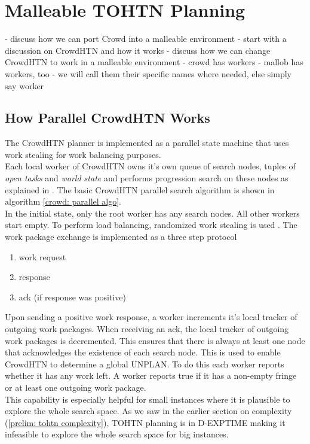 \section{Malleable TOHTN Planning}
- discuss how we can port Crowd into a malleable environment
- start with a discussion on CrowdHTN and how it works
- discuss how we can change CrowdHTN to work in a malleable environment
- crowd has workers
- mallob has workers, too
- we will call them their specific names where needed, else simply say worker

\subsection{How Parallel CrowdHTN Works}
The CrowdHTN planner is implemented as a parallel state machine that uses work stealing for work balancing purposes. \\
Each local worker of CrowdHTN owns it's own queue of search nodes, tuples of \textit{open tasks} and \textit{world state} and performs progression search on these nodes as explained in . The basic CrowdHTN parallel search algorithm is shown in algorithm \ref{crowd: parallel algo}. \\
In the initial state, only the root worker has any search nodes. All other workers start empty. To perform load balancing, randomized work stealing is used . The work package exchange is implemented as a three step protocol
\begin{enumerate}
	\item work request
	\item response
	\item ack (if response was positive)
\end{enumerate}
Upon sending a positive work response, a worker increments it's local tracker of outgoing work packages. When receiving an ack, the local tracker of outgoing work packages is decremented. This ensures that there is always at least one node that acknowledges the existence of each search node. This is used to enable CrowdHTN to determine a global UNPLAN. To do this each worker reports whether it has any work left. A worker reports true if it has a non-empty fringe or at least one outgoing work package. \\
This capability is especially helpful for small instances where it is plausible to explore the whole search space. As we saw in the earlier section on complexity (\ref{prelim: tohtn complexity}), TOHTN planning is in D-EXPTIME making it infeasible to explore the whole search space for big instances.
